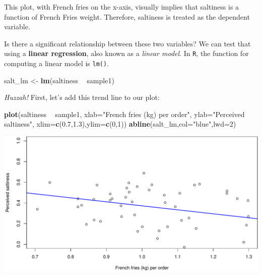 \documentclass[]{book}
\newenvironment{Shaded}{\begin{snugshade}}{\end{snugshade}}
\newcommand{\DataTypeTok}[1]{\textcolor[rgb]{0.13,0.29,0.53}{#1}}
\newcommand{\DecValTok}[1]{\textcolor[rgb]{0.00,0.00,0.81}{#1}}
\newcommand{\FloatTok}[1]{\textcolor[rgb]{0.00,0.00,0.81}{#1}}
\newcommand{\KeywordTok}[1]{\textcolor[rgb]{0.13,0.29,0.53}{\textbf{#1}}}
\newcommand{\NormalTok}[1]{#1}
\newcommand{\OperatorTok}[1]{\textcolor[rgb]{0.81,0.36,0.00}{\textbf{#1}}}
\newcommand{\StringTok}[1]{\textcolor[rgb]{0.31,0.60,0.02}{#1}}
\begin{document}
This plot, with French fries on the x-axis, visually implies that saltiness is a function of French Fries weight. Therefore, saltiness is treated as the dependent variable.

Is there a significant relationship between these two variables? We can test that using a \textbf{linear regression}, also known as a \emph{linear model}. In \texttt{R}, the function for computing a linear model is \texttt{lm()}.

\begin{Shaded}
\begin{Highlighting}[]
\NormalTok{salt_lm <-}\StringTok{ }\KeywordTok{lm}\NormalTok{(saltiness }\OperatorTok{~}\StringTok{ }\NormalTok{sample1)}
\end{Highlighting}
\end{Shaded}

\emph{Huzzah!} First, let's add this trend line to our plot:

\begin{Shaded}
\begin{Highlighting}[]
\KeywordTok{plot}\NormalTok{(saltiness }\OperatorTok{~}\StringTok{ }\NormalTok{sample1,}
     \DataTypeTok{xlab=}\StringTok{"French fries (kg) per order"}\NormalTok{,}
     \DataTypeTok{ylab=}\StringTok{"Perceived saltiness"}\NormalTok{,}
     \DataTypeTok{xlim=}\KeywordTok{c}\NormalTok{(}\FloatTok{0.7}\NormalTok{,}\FloatTok{1.3}\NormalTok{),}\DataTypeTok{ylim=}\KeywordTok{c}\NormalTok{(}\DecValTok{0}\NormalTok{,}\DecValTok{1}\NormalTok{))}
\KeywordTok{abline}\NormalTok{(salt_lm,}\DataTypeTok{col=}\StringTok{"blue"}\NormalTok{,}\DataTypeTok{lwd=}\DecValTok{2}\NormalTok{)}
\end{Highlighting}
\end{Shaded}

\includegraphics{figures/unnamed-chunk-336-1.pdf}
\end{document}
